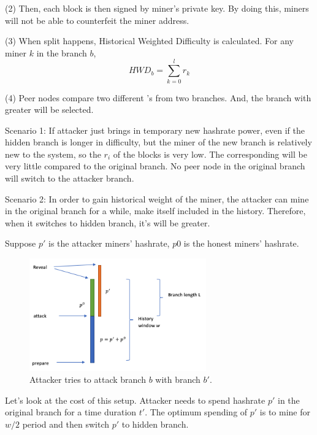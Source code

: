 \documentclass[conference]{IEEEtran}
\begin{document}
(2) Then, each block is then signed by miner's private key. By doing this, miners will not be able to counterfeit the miner address.

(3) When split happens, Historical Weighted Difficulty   is calculated. For any miner $k$ in the branch $b$,
\begin{equation}
    H\!W\!D_b = \sum_{k=0}^{l}r_k\label{eq}
\end{equation}

(4) Peer nodes compare two different 's from two branches. And, the branch with greater  will be selected.

Scenario 1: If attacker just brings in temporary new hashrate power, even if the hidden branch is longer in difficulty, but the miner of the new branch is relatively new to the system, so the $r_i$ of the blocks is very low. The corresponding  will be very little compared to the original branch. No peer node in the original branch will switch to the attacker branch. 

Scenario 2: In order to gain historical weight of the miner, the attacker can mine in the original branch for a while, make itself included in the history. Therefore, when it switches to hidden branch, it’s  will be greater. 

Suppose $p'$ is the attacker miners' hashrate, $p0$ is the honest miners' hashrate.

\begin{figure}[htbp]
\centerline{\includegraphics[width=3in]{figure.png}}
\caption{Attacker tries to attack branch $b$ with branch $b'$.}
\label{fig}
\end{figure}

Let's look at the cost of this setup. Attacker needs to spend hashrate $p'$ in the original branch for a time duration $t'$. The optimum spending of $p'$ is to mine for $w/2$ period and then switch $p'$ to hidden branch. 
\end{document}
